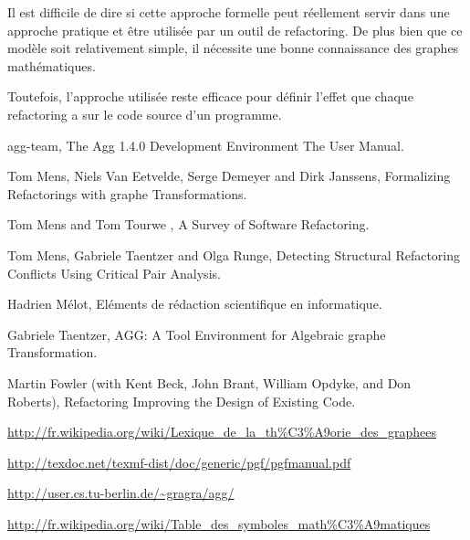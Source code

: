 \documentclass[a4paper, 12pt]{article}
\begin{document}
  Il est difficile de dire si cette approche formelle peut réellement servir dans une approche pratique et être utilisée par un outil de refactoring.
  De plus bien que ce modèle soit relativement simple, il nécessite une bonne connaissance des graphes mathématiques.

  Toutefois, l'approche utilisée reste efficace pour définir l'effet que chaque refactoring a sur le code source d'un programme.

  \newpage

  \begin{thebibliography}{9}

    agg-team,
    The Agg 1.4.0 Development Environment The User Manual.

    Tom Mens, Niels Van Eetvelde, Serge Demeyer and Dirk Janssens,
    Formalizing Refactorings with graphe Transformations.

    Tom Mens and Tom Tourwe ,
    A Survey of Software Refactoring.

    Tom Mens, Gabriele Taentzer and Olga Runge,
    Detecting Structural Refactoring Conflicts Using Critical Pair Analysis.

    Hadrien Mélot,
    Eléments de rédaction scientifique en informatique.

    Gabriele Taentzer,
    AGG: A Tool Environment for Algebraic graphe Transformation.

    Martin Fowler (with Kent Beck, John Brant, William Opdyke, and Don Roberts),
    Refactoring Improving the Design of Existing Code.

    \url{http://fr.wikipedia.org/wiki/Lexique_de_la_th%C3%A9orie_des_graphees}

    \url{http://texdoc.net/texmf-dist/doc/generic/pgf/pgfmanual.pdf}

    \url{http://user.cs.tu-berlin.de/~gragra/agg/}

    \url{http://fr.wikipedia.org/wiki/Table_des_symboles_math%C3%A9matiques}

  \end{thebibliography}
\end{document}
